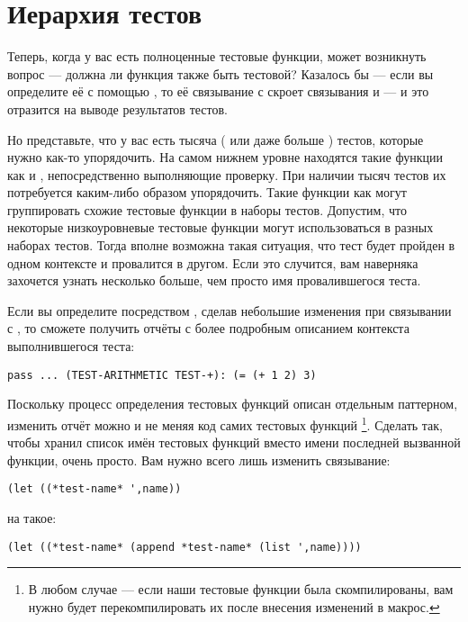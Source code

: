 \section{Иерархия тестов}

Теперь, когда у вас есть полноценные тестовые функции, может возникнуть вопрос --- должна
ли функция  также быть тестовой? Казалось бы --- если вы определите
её с помощью , то её связывание с  скроет связывания
 и  --- и это отразится на выводе результатов тестов.

Но представьте, что у вас есть тысяча ( или даже больше ) тестов, которые нужно как-то
упорядочить. На самом нижнем уровне находятся такие функции как  и
, непосредственно выполняющие проверку. При наличии тысяч тестов их
потребуется каким-либо образом упорядочить. Такие функции как  могут
группировать схожие тестовые функции в наборы тестов. Допустим, что некоторые
низкоуровневые тестовые функции могут использоваться в разных наборах тестов. Тогда вполне
возможна такая ситуация, что тест будет пройден в одном контексте и провалится в
другом. Если это случится, вам наверняка захочется узнать несколько больше, чем просто имя
провалившегося теста.

Если вы определите  посредством , сделав небольшие
изменения при связывании с , то сможете получить отчёты с более
подробным описанием контекста выполнившегося теста:

\begin{lstlisting}
pass ... (TEST-ARITHMETIC TEST-+): (= (+ 1 2) 3)
\end{lstlisting}

Поскольку процесс определения тестовых функций описан отдельным паттерном, изменить отчёт
можно и не меняя код самих тестовых функций \footnote{В любом случае --- если наши
  тестовые функции была скомпилированы, вам нужно будет перекомпилировать их после
  внесения изменений в макрос.}. Сделать так, чтобы  хранил список имён
тестовых функций вместо имени последней вызванной функции, очень просто. Вам нужно всего
лишь изменить связывание:

\begin{lstlisting}
(let ((*test-name* ',name))
\end{lstlisting}

на такое:

\begin{lstlisting}
(let ((*test-name* (append *test-name* (list ',name))))
\end{lstlisting}

